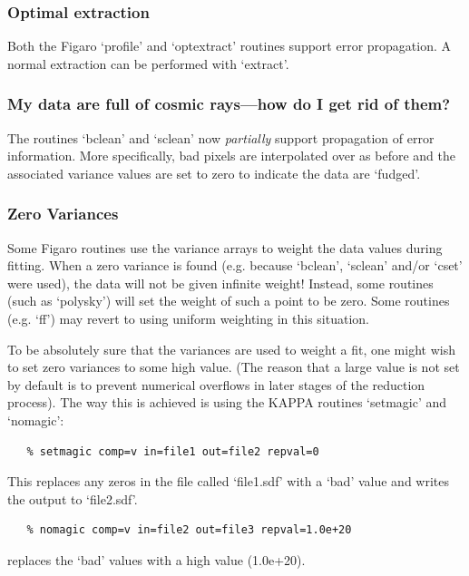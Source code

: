 \documentclass[11pt,twoside]{article}
\begin{document}
\subsubsection{Optimal extraction}

Both the Figaro `profile' and `optextract' routines support error propagation.
A normal extraction can be performed with `extract'.

\subsubsection{My data are full of cosmic rays---how do I get rid of them?}

The routines `bclean' and `sclean'
now {\it partially} support propagation of error
information. More specifically, bad pixels are interpolated over as before
and the associated variance values are set to zero to indicate the data are
`fudged'.

\subsubsection{Zero Variances}

Some Figaro routines use the variance arrays to weight the data values
during fitting. When a zero variance is found (e.g. because `bclean',
`sclean'
and/or `cset' were used),
the data will not be given
infinite weight! Instead, some routines (such as `polysky') will set the
weight of such a point to be zero.  Some routines (e.g. `ff')
may revert to using uniform weighting in this situation.

To be absolutely sure that the variances are used to weight a fit, one
might wish to set zero variances to some high value.  (The reason
that a large value is not set by default is to prevent numerical overflows
in later stages of the reduction process). The way this is achieved is
using the KAPPA routines `setmagic' and `nomagic':

\begin{verbatim}
   % setmagic comp=v in=file1 out=file2 repval=0
\end{verbatim}

This replaces any zeros in the file called `file1.sdf' with a `bad' value
and writes the output to `file2.sdf'.

\begin{verbatim}
   % nomagic comp=v in=file2 out=file3 repval=1.0e+20
\end{verbatim}

replaces the `bad' values with a high value (1.0e+20).
\end{document}
